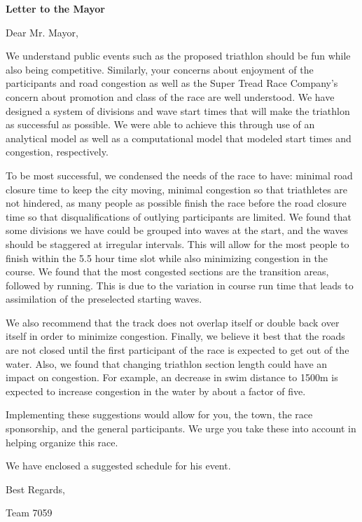 \documentclass[12pt]{article}
\begin{document}
\clearpage
\Large
\noindent
\textbf{Letter to the Mayor}\par{}
\vspace{2ex}
\normalsize
\noindent
Dear Mr. Mayor,\par
\vspace{4ex}
\noindent
We understand public events such as the proposed triathlon should be fun while also being competitive. Similarly, your concerns about enjoyment of the participants and road congestion as well as the Super Tread Race Company's concern about promotion and class of the race are well understood. We have designed a system of divisions and wave start times that will make the triathlon as successful as possible. We were able to achieve this through use of an analytical model as well as a computational model that modeled start times and congestion, respectively.\par{}
\vspace{2ex}
\noindent
To be most successful, we condensed the needs of the race to have: minimal road closure time to keep the city moving, minimal congestion so that triathletes are not hindered, as many people as possible finish the race before the road closure time so that disqualifications of outlying participants are limited. We found that some divisions we have could be grouped into waves at the start, and the waves should be staggered at irregular intervals. This will allow for the most people to finish within the 5.5 hour time slot while also minimizing congestion in the course. We found that the most congested sections are the transition areas, followed by running. This is due to the variation in course run time that leads to assimilation of the preselected starting waves.\par 
\vspace{2ex}
\noindent
We also recommend that the track does not overlap itself or double back over itself in order to minimize congestion. Finally, we believe it best that the roads are not closed until the first participant of the race is expected to get out of the water. Also, we found that changing triathlon section length could have an impact on congestion. For example, an decrease in swim distance to 1500m is expected to increase congestion in the water by about a factor of five.\par
\vspace{2ex}
\noindent
Implementing these suggestions would allow for you, the town, the race sponsorship, and the general participants. We urge you take these into account in helping organize this race.\par{}
\vspace{2ex}
\noindent
We have enclosed a suggested schedule for his event.
\par{}
\vspace{4ex}
\noindent
Best Regards,\par{}
\vspace{5ex}
\noindent
Team 7059
\end{document}
